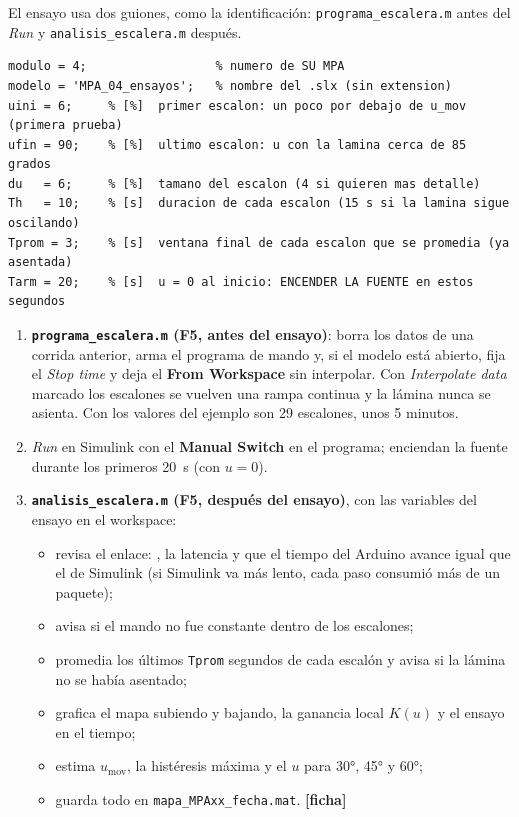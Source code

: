 \documentclass[11pt,letterpaper]{article}
\newcommand{\blq}[1]{\textsf{\textbf{#1}}}                 %
\newcommand{\sen}[1]{\texttt{\detokenize{#1}}}             %
\newcommand{\ficha}{\textcolor{verdeOK}{\textbf{[ficha]}}}  %
\begin{document}
El ensayo usa dos guiones, como la identificación: \texttt{programa\_escalera.m} antes del \emph{Run} y \texttt{analisis\_escalera.m} después.

\begin{lstlisting}[caption={\texttt{programa\_escalera.m}: lo que se ajusta antes del \emph{Run}.}]
modulo = 4;                  % numero de SU MPA
modelo = 'MPA_04_ensayos';   % nombre del .slx (sin extension)
uini = 6;     % [%]  primer escalon: un poco por debajo de u_mov (primera prueba)
ufin = 90;    % [%]  ultimo escalon: u con la lamina cerca de 85 grados
du   = 6;     % [%]  tamano del escalon (4 si quieren mas detalle)
Th   = 10;    % [s]  duracion de cada escalon (15 s si la lamina sigue oscilando)
Tprom = 3;    % [s]  ventana final de cada escalon que se promedia (ya asentada)
Tarm = 20;    % [s]  u = 0 al inicio: ENCENDER LA FUENTE en estos segundos
\end{lstlisting}

\begin{enumerate}[leftmargin=14pt]
  \item \textbf{\texttt{programa\_escalera.m} (F5, antes del ensayo)}: borra los datos de una corrida anterior, arma el programa de mando \sen{u_prog} y, si el modelo está abierto, fija el \emph{Stop time} y deja el \blq{From Workspace} sin interpolar. Con \emph{Interpolate data} marcado los escalones se vuelven una rampa continua y la lámina nunca se asienta. Con los valores del ejemplo son 29 escalones, unos 5 minutos.
  \item \emph{Run} en Simulink con el \blq{Manual Switch} en el programa; enciendan la fuente durante los primeros 20~s (con $u=0$).
  \item \textbf{\texttt{analisis\_escalera.m} (F5, después del ensayo)}, con las variables del ensayo en el workspace:
  \begin{itemize}[leftmargin=12pt]
    \item revisa el enlace: \sen{diff(t_ard)}, la latencia y que el tiempo del Arduino avance igual que el de Simulink (si Simulink va más lento, cada paso consumió más de un paquete);
    \item avisa si el mando no fue constante dentro de los escalones;
    \item promedia los últimos \texttt{Tprom} segundos de cada escalón y avisa si la lámina no se había asentado;
    \item grafica el mapa subiendo y bajando, la ganancia local $K(u)$ y el ensayo en el tiempo;
    \item estima $u_\text{mov}$, la histéresis máxima y el $u$ para 30°, 45° y 60°;
    \item guarda todo en \texttt{mapa\_MPAxx\_fecha.mat}. \ficha
  \end{itemize}
\end{enumerate}
\end{document}
